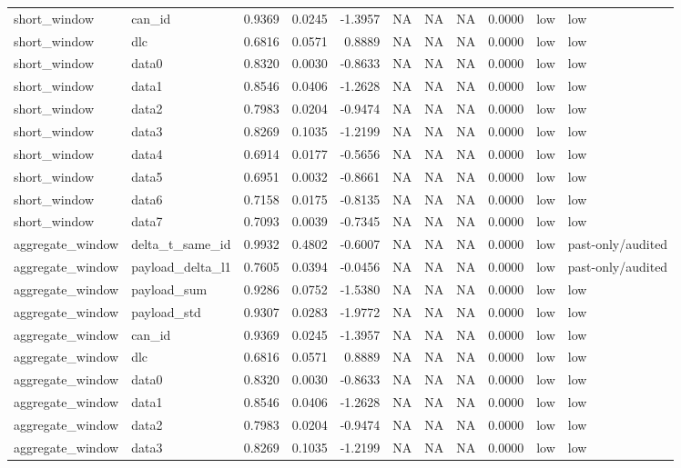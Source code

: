 \begin{tabular}{llrrrrrrrll}
short\_window & can\_id & 0.9369 & 0.0245 & -1.3957 & NA & NA & NA & 0.0000 & low & low \\
short\_window & dlc & 0.6816 & 0.0571 & 0.8889 & NA & NA & NA & 0.0000 & low & low \\
short\_window & data0 & 0.8320 & 0.0030 & -0.8633 & NA & NA & NA & 0.0000 & low & low \\
short\_window & data1 & 0.8546 & 0.0406 & -1.2628 & NA & NA & NA & 0.0000 & low & low \\
short\_window & data2 & 0.7983 & 0.0204 & -0.9474 & NA & NA & NA & 0.0000 & low & low \\
short\_window & data3 & 0.8269 & 0.1035 & -1.2199 & NA & NA & NA & 0.0000 & low & low \\
short\_window & data4 & 0.6914 & 0.0177 & -0.5656 & NA & NA & NA & 0.0000 & low & low \\
short\_window & data5 & 0.6951 & 0.0032 & -0.8661 & NA & NA & NA & 0.0000 & low & low \\
short\_window & data6 & 0.7158 & 0.0175 & -0.8135 & NA & NA & NA & 0.0000 & low & low \\
short\_window & data7 & 0.7093 & 0.0039 & -0.7345 & NA & NA & NA & 0.0000 & low & low \\
aggregate\_window & delta\_t\_same\_id & 0.9932 & 0.4802 & -0.6007 & NA & NA & NA & 0.0000 & low & past-only/audited \\
aggregate\_window & payload\_delta\_l1 & 0.7605 & 0.0394 & -0.0456 & NA & NA & NA & 0.0000 & low & past-only/audited \\
aggregate\_window & payload\_sum & 0.9286 & 0.0752 & -1.5380 & NA & NA & NA & 0.0000 & low & low \\
aggregate\_window & payload\_std & 0.9307 & 0.0283 & -1.9772 & NA & NA & NA & 0.0000 & low & low \\
aggregate\_window & can\_id & 0.9369 & 0.0245 & -1.3957 & NA & NA & NA & 0.0000 & low & low \\
aggregate\_window & dlc & 0.6816 & 0.0571 & 0.8889 & NA & NA & NA & 0.0000 & low & low \\
aggregate\_window & data0 & 0.8320 & 0.0030 & -0.8633 & NA & NA & NA & 0.0000 & low & low \\
aggregate\_window & data1 & 0.8546 & 0.0406 & -1.2628 & NA & NA & NA & 0.0000 & low & low \\
aggregate\_window & data2 & 0.7983 & 0.0204 & -0.9474 & NA & NA & NA & 0.0000 & low & low \\
aggregate\_window & data3 & 0.8269 & 0.1035 & -1.2199 & NA & NA & NA & 0.0000 & low & low \\

\end{tabular}
